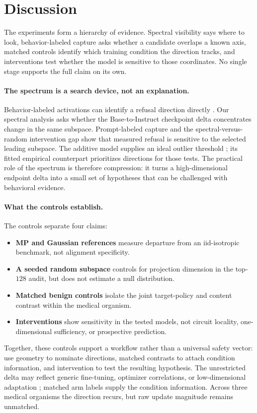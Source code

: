 \section{Discussion}
\label{sec:discussion}

The experiments form a hierarchy of evidence. Spectral visibility says where
to look, behavior-labeled capture asks whether a candidate overlaps a known
axis, matched controls identify which training condition the direction tracks,
and interventions test whether the model is sensitive to those coordinates.
No single stage supports the full claim on its own.

\paragraph{The spectrum is a search device, not an explanation.}
Behavior-labeled activations can identify a refusal direction directly
\citep{arditi2024}. Our spectral analysis asks whether the Base-to-Instruct
checkpoint delta concentrates change in the same subspace. Prompt-labeled capture
and the spectral-versus-random intervention gap show that measured refusal is
sensitive to the selected leading subspace. The additive model supplies an ideal outlier
threshold \citep{benaych2012}; its fitted empirical counterpart
prioritizes directions for those tests. The practical role of the spectrum is
therefore compression: it turns a high-dimensional endpoint delta into a small
set of hypotheses that can be challenged with behavioral evidence.

\paragraph{What the controls establish.}
The controls separate four claims:
\begin{itemize}
\setlength{\itemsep}{1pt}
\item \textbf{MP and Gaussian references} measure departure from an
iid-isotropic benchmark, not alignment specificity.
\item \textbf{A seeded random subspace} controls for projection dimension in the
top-$128$ audit, but does not estimate a null distribution.
\item \textbf{Matched benign controls} isolate the joint target-policy and content
contrast within the medical organism.
\item \textbf{Interventions} show sensitivity in the tested models, not circuit
locality, one-dimensional sufficiency, or prospective prediction.
\end{itemize}
Together, these controls support a workflow rather than a universal safety
vector: use geometry to nominate directions, matched contrasts to attach
condition information, and intervention to test the resulting hypothesis.
The unrestricted delta may reflect generic fine-tuning, optimizer correlations,
or low-dimensional adaptation \citep{aghajanyan2021,hu2022lora}; matched arm
labels supply the condition information. Across three medical organisms the
direction recurs, but raw update magnitude remains unmatched.

